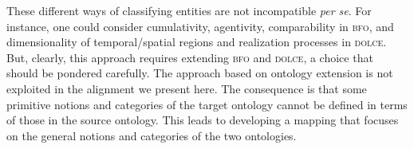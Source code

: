 \documentclass[ao]{iosart2x}
\newcommand{\bflist}{\begin{list}{}{\setlength{\topsep}{2mm}\setlength{\parsep}{0mm}\setlength{\leftmargin}{9.2mm}\setlength{\labelwidth}{8mm}}}
\newcommand{\bfoAxLabel}{\textrm{a$_\texttt{b}$}}
\newcommand{\bfoThrLabel}{\textrm{t$_\texttt{b}$}}
\newcommand{\dbAxLabel}{\textrm{a}$_\texttt{db}$}
\newcommand{\refbfoax}[1]{({\bfoAxLabel}\ref{#1})}
\newcommand{\refbfoth}[1]{({\bfoThrLabel}\ref{#1})}
\newcommand{\refdbax}[1]{({\dbAxLabel}\ref{#1})}
\newcommand{\dolce}{{\textsc{dolce}}}
\newcommand{\bfo}{{\textsc{bfo}}}
\newcommand {\thbfo} {\ensuremath{\mathfrak{B}}}
\newcommand{\bfoiof}[1]{{\,::_{#1\:\!}}}
\begin{document}
\smallskip
These different ways of classifying entities are not incompatible \textit{per se}. For instance, one could consider cumulativity, agentivity, comparability in {\bfo}, and dimensionality of temporal/spatial regions and realization processes in {\dolce}. But, clearly, this approach requires extending {\bfo} and {\dolce}, a choice that should be pondered carefully. The approach based on ontology extension is not exploited in the alignment we present here. The consequence is that some primitive notions and categories of the target ontology cannot be defined in terms of those in the source ontology. This leads to developing a mapping that focuses on the general notions and categories of the two ontologies.
   





%


%
%
%
%




\end{document}
